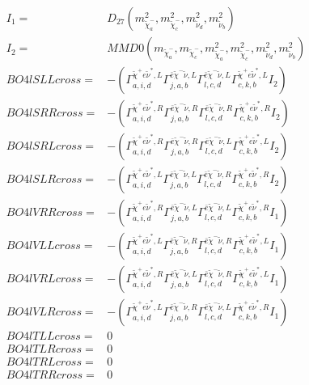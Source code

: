 \documentclass[A4,landscape]{article}
\begin{document}
\begin{align} 
I_1 = & D_{27}(m^2_{\tilde{\chi}^-_{{a}}}, m^2_{\tilde{\chi}^-_{{c}}}, m^2_{\tilde{\nu}_{{d}}}, m^2_{\tilde{\nu}_{{b}}}) \\ 
I_2 = & MMD0(m_{\tilde{\chi}^-_{{a}}}, m_{\tilde{\chi}^-_{{c}}}, m^2_{\tilde{\chi}^-_{{a}}}, m^2_{\tilde{\chi}^-_{{c}}}, m^2_{\tilde{\nu}_{{d}}}, m^2_{\tilde{\nu}_{{b}}}) \\ 
  BO4lSLLcross= & -( \Gamma^{\tilde{\chi}^+e \tilde{\nu}^*,L}_{a, i, d} \Gamma^{\bar{e}\tilde{\chi}^- \tilde{\nu} ,L}_{j, a, b} \Gamma^{\bar{e}\tilde{\chi}^- \tilde{\nu} ,L}_{l, c, d} \Gamma^{\tilde{\chi}^+e \tilde{\nu}^*,L}_{c, k, b} I_2) \\ 
  BO4lSRRcross= & -( \Gamma^{\tilde{\chi}^+e \tilde{\nu}^*,R}_{a, i, d} \Gamma^{\bar{e}\tilde{\chi}^- \tilde{\nu} ,R}_{j, a, b} \Gamma^{\bar{e}\tilde{\chi}^- \tilde{\nu} ,R}_{l, c, d} \Gamma^{\tilde{\chi}^+e \tilde{\nu}^*,R}_{c, k, b} I_2) \\ 
  BO4lSRLcross= & -( \Gamma^{\tilde{\chi}^+e \tilde{\nu}^*,R}_{a, i, d} \Gamma^{\bar{e}\tilde{\chi}^- \tilde{\nu} ,R}_{j, a, b} \Gamma^{\bar{e}\tilde{\chi}^- \tilde{\nu} ,L}_{l, c, d} \Gamma^{\tilde{\chi}^+e \tilde{\nu}^*,L}_{c, k, b} I_2) \\ 
  BO4lSLRcross= & -( \Gamma^{\tilde{\chi}^+e \tilde{\nu}^*,L}_{a, i, d} \Gamma^{\bar{e}\tilde{\chi}^- \tilde{\nu} ,L}_{j, a, b} \Gamma^{\bar{e}\tilde{\chi}^- \tilde{\nu} ,R}_{l, c, d} \Gamma^{\tilde{\chi}^+e \tilde{\nu}^*,R}_{c, k, b} I_2) \\ 
  BO4lVRRcross= & -( \Gamma^{\tilde{\chi}^+e \tilde{\nu}^*,R}_{a, i, d} \Gamma^{\bar{e}\tilde{\chi}^- \tilde{\nu} ,L}_{j, a, b} \Gamma^{\bar{e}\tilde{\chi}^- \tilde{\nu} ,L}_{l, c, d} \Gamma^{\tilde{\chi}^+e \tilde{\nu}^*,R}_{c, k, b} I_1) \\ 
  BO4lVLLcross= & -( \Gamma^{\tilde{\chi}^+e \tilde{\nu}^*,L}_{a, i, d} \Gamma^{\bar{e}\tilde{\chi}^- \tilde{\nu} ,R}_{j, a, b} \Gamma^{\bar{e}\tilde{\chi}^- \tilde{\nu} ,R}_{l, c, d} \Gamma^{\tilde{\chi}^+e \tilde{\nu}^*,L}_{c, k, b} I_1) \\ 
  BO4lVRLcross= & -( \Gamma^{\tilde{\chi}^+e \tilde{\nu}^*,R}_{a, i, d} \Gamma^{\bar{e}\tilde{\chi}^- \tilde{\nu} ,L}_{j, a, b} \Gamma^{\bar{e}\tilde{\chi}^- \tilde{\nu} ,R}_{l, c, d} \Gamma^{\tilde{\chi}^+e \tilde{\nu}^*,L}_{c, k, b} I_1) \\ 
  BO4lVLRcross= & -( \Gamma^{\tilde{\chi}^+e \tilde{\nu}^*,L}_{a, i, d} \Gamma^{\bar{e}\tilde{\chi}^- \tilde{\nu} ,R}_{j, a, b} \Gamma^{\bar{e}\tilde{\chi}^- \tilde{\nu} ,L}_{l, c, d} \Gamma^{\tilde{\chi}^+e \tilde{\nu}^*,R}_{c, k, b} I_1) \\ 
  BO4lTLLcross= & 0 \\ 
  BO4lTLRcross= & 0 \\ 
  BO4lTRLcross= & 0 \\ 
  BO4lTRRcross= & 0 \\ 
\end{align} 
\end{document}
